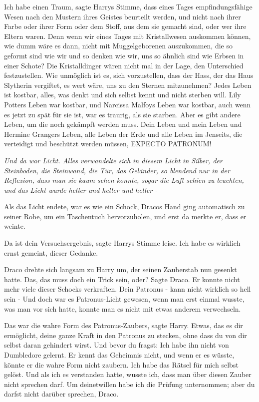 \glqq{}Ich habe einen Traum\grqq{}, sagte Harrys Stimme, \glqq{}dass eines Tages
empfindungsfähige Wesen nach den Mustern ihres Geistes beurteilt werden, und
nicht nach ihrer Farbe oder ihrer Form oder dem Stoff, aus dem sie gemacht sind,
oder wer ihre Eltern waren. Denn wenn wir eines Tages mit Kristallwesen
auskommen können, wie dumm wäre es dann, nicht mit Muggelgeborenen auszukommen,
die so geformt sind wie wir und so denken wie wir, uns so ähnlich sind wie
Erbsen in einer Schote? Die Kristalldinger wären nicht mal in der Lage, den
Unterschied festzustellen. Wie unmöglich ist es, sich vorzustellen, dass der
Hass, der das Haus Slytherin vergiftet, es wert wäre, uns zu den Sternen
mitzunehmen? Jedes Leben ist kostbar, alles, was denkt und sich selbst kennt und
nicht sterben will. Lily Potters Leben war kostbar, und Narcissa Malfoys Leben
war kostbar, auch wenn es jetzt zu spät für sie ist, war es traurig, als sie
starben. Aber es gibt andere Leben, um die noch gekämpft werden muss. Dein Leben
und mein Leben und Hermine Grangers Leben, alle Leben der Erde und alle Leben im
Jenseits, die verteidigt und beschützt werden müssen, EXPECTO PATRONUM!\grqq{}

\emph{Und da war Licht. Alles
verwandelte sich in diesem Licht in Silber, der Steinboden, die Steinwand, die
Tür, das Geländer, so blendend nur in der Reflexion, dass man sie kaum sehen
konnte, sogar die Luft schien zu leuchten, und das Licht wurde heller und heller
und heller -}

Als das Licht endete, war es wie ein Schock, Dracos Hand ging automatisch zu
seiner Robe, um ein Taschentuch hervorzuholen, und erst da merkte er, dass er
weinte.

\glqq{}Da ist dein Versuchsergebnis\grqq{}, sagte Harrys Stimme leise. \glqq{}Ich
habe es wirklich ernst gemeint, dieser Gedanke.\grqq{}

Draco drehte sich langsam zu Harry um, der seinen Zauberstab nun gesenkt hatte.
\glqq{}Das, das muss doch ein Trick sein, oder?\grqq{} Sagte Draco. Er konnte
nicht mehr viele dieser Schocks verkraften. \glqq{}Dein Patronus - kann nicht
wirklich so hell sein -\grqq{} Und doch war es Patronus-Licht gewesen, wenn man
erst einmal wusste, was man vor sich hatte, konnte man es nicht mit etwas
anderem verwechseln.

\glqq{}Das war die wahre Form des Patronus-Zaubers\grqq{}, sagte Harry. \glqq{}
Etwas, das es dir ermöglicht, deine ganze Kraft in den Patronus zu stecken, ohne
dass du von dir selbst daran gehindert wirst. Und bevor du fragst: Ich habe ihn
nicht von Dumbledore gelernt. Er kennt das Geheimnis nicht, und wenn er es
wüsste, könnte er die wahre Form nicht zaubern. Ich habe das Rätsel für mich
selbst gelöst. Und als ich es verstanden hatte, wusste ich, dass man über diesen
Zauber nicht sprechen darf. Um deinetwillen habe ich die Prüfung unternommen;
aber du darfst nicht darüber sprechen, Draco.\grqq{}

